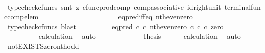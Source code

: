 \begin{isabellebody}
\ \ \ \ \ \ \ \ \isamarkupfalse%
\ {\isacharparenleft}{\kern0pt}typecheck{\isacharunderscore}{\kern0pt}cfuncs{\isacharcomma}{\kern0pt}\ smt\ {\isacharparenleft}{\kern0pt}z{}{\isacharparenright}{\kern0pt}\ cfunc{\isacharunderscore}{\kern0pt}prod{\isacharunderscore}{\kern0pt}comp\ comp{\isacharunderscore}{\kern0pt}associative{}\ id{\isacharunderscore}{\kern0pt}right{\isacharunderscore}{\kern0pt}unit{}\ terminal{\isacharunderscore}{\kern0pt}func{\isacharunderscore}{\kern0pt}comp{\isacharunderscore}{\kern0pt}elem{\isacharparenright}{\kern0pt}\isanewline
\ \ \ \ \ \ \isamarkupfalse%
\ \isamarkupfalse%
\ {\isachardoublequoteopen}{\isachardot}{\kern0pt}{\isachardot}{\kern0pt}{\isachardot}{\kern0pt}\ {\isacharequal}{\kern0pt}\ {\isasymt}{\isachardoublequoteclose}\isanewline
\ \ \ \ \ \ \ \ \isamarkupfalse%
\ eq{\isacharunderscore}{\kern0pt}pred{\isacharunderscore}{\kern0pt}iff{\isacharunderscore}{\kern0pt}eq\ nth{\isacharunderscore}{\kern0pt}even{\isacharunderscore}{\kern0pt}zero\ \isamarkupfalse%
\ {\isacharparenleft}{\kern0pt}typecheck{\isacharunderscore}{\kern0pt}cfuncs{\isacharcomma}{\kern0pt}\ blast{\isacharparenright}{\kern0pt}\isanewline
\ \ \ \ \ \ \isamarkupfalse%
\ \isamarkupfalse%
\ {\isachardoublequoteopen}{\isacharparenleft}{\kern0pt}eq{\isacharunderscore}{\kern0pt}pred\ {\isasymnat}\isactrlsub c\ {\isasymcirc}\isactrlsub c\ {\isasymlangle}nth{\isacharunderscore}{\kern0pt}even{\isacharcomma}{\kern0pt}zero\ {\isasymcirc}\isactrlsub c\ {\isasymbeta}\isactrlbsub {\isasymnat}\isactrlsub c\isactrlesub {\isasymrangle}{\isacharparenright}{\kern0pt}\ {\isasymcirc}\isactrlsub c\ zero\ {\isacharequal}{\kern0pt}\ {\isasymt}{\isachardoublequoteclose}\isanewline
\ \ \ \ \ \ \ \ \isamarkupfalse%
\ calculation\ \isamarkupfalse%
\ auto\isanewline
\ \ \ \ \isamarkupfalse%
\isanewline
\ \ \isamarkupfalse%
\isanewline
\ \ \isamarkupfalse%
\ \isamarkupfalse%
\ {\isacharquery}{\kern0pt}thesis\isanewline
\ \ \ \ \isamarkupfalse%
\ calculation\ \isamarkupfalse%
\ auto\isanewline
{}\isamarkupfalse%
%
\endisatagproof
{\isafoldproof}%
%
\isadelimproof
\isanewline
%
\endisadelimproof
\isanewline
{}\isamarkupfalse%
\ not{\isacharunderscore}{\kern0pt}EXISTS{\isacharunderscore}{\kern0pt}zero{\isacharunderscore}{\kern0pt}nth{\isacharunderscore}{\kern0pt}odd{\isacharcolon}{\kern0pt}\isanewline

\end{isabellebody}
